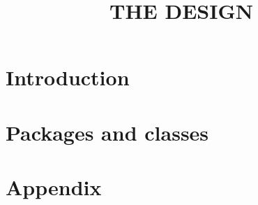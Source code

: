 \documentclass[a4paper, parskip=half]{scrartcl}
\title{THE DESIGN}
\begin{document}
\maketitle
\thispagestyle{empty}
\newpage
\tableofcontents
\newpage
\section{Introduction}
\section{Packages and classes}



\section{Appendix}

\end{document}
